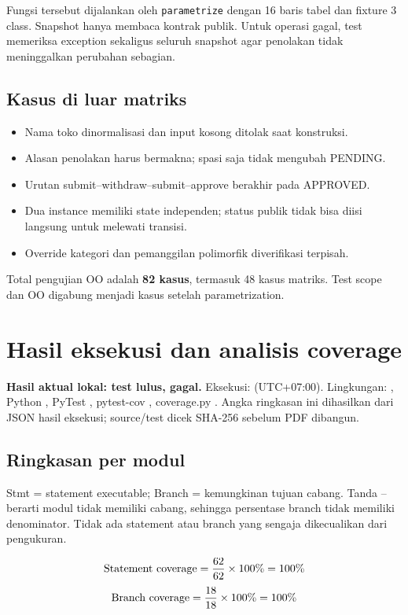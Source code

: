 \documentclass[11pt,a4paper]{article}
\newcommand{\note}[1]{\begingroup\setlength{\fboxsep}{9pt}
\colorbox{pale}{\parbox{\dimexpr\linewidth-18pt\relax}{\small #1}}\par\endgroup}
\begin{document}
Fungsi tersebut dijalankan oleh \texttt{parametrize} dengan 16 baris tabel
dan fixture 3 class. Snapshot hanya membaca kontrak publik. Untuk operasi
gagal, test memeriksa exception sekaligus seluruh snapshot agar penolakan
tidak meninggalkan perubahan sebagian.

\subsection{Kasus di luar matriks}
\begin{itemize}
\item Nama toko dinormalisasi dan input kosong ditolak saat konstruksi.
\item Alasan penolakan harus bermakna; spasi saja tidak mengubah PENDING.
\item Urutan submit--withdraw--submit--approve berakhir pada APPROVED.
\item Dua instance memiliki state independen; status publik tidak bisa diisi
langsung untuk melewati transisi.
\item Override kategori dan pemanggilan polimorfik diverifikasi terpisah.
\end{itemize}
Total pengujian OO adalah \textbf{82 kasus}, termasuk 48 kasus matriks.
Test scope dan OO digabung menjadi \TestTotal{} kasus setelah parametrization.

\newpage
\section{Hasil eksekusi dan analisis coverage}
\note{\textbf{Hasil aktual lokal: \TestTotal{} test lulus, \TestFailures{}
gagal.} Eksekusi: \texttt{\RunAt} (UTC+07:00). Lingkungan:
\RunPlatform{}, Python \PythonVersion{}, PyTest \PytestVersion{},
pytest-cov \PytestCovVersion{}, coverage.py \CovVersion{}. Angka ringkasan
ini dihasilkan dari JSON hasil eksekusi; source/test dicek SHA-256 sebelum
PDF dibangun.}

\subsection{Ringkasan per modul}
\small

\normalsize

Stmt = statement executable; Branch = kemungkinan tujuan cabang.
Tanda -- berarti modul tidak memiliki cabang, sehingga persentase branch
tidak memiliki denominator. Tidak ada statement atau branch yang sengaja
dikecualikan dari pengukuran.

\[
\text{Statement coverage} = \frac{62}{62}\times100\%=100\%
\]
\[
\text{Branch coverage} = \frac{18}{18}\times100\%=100\%
\]

\end{document}
